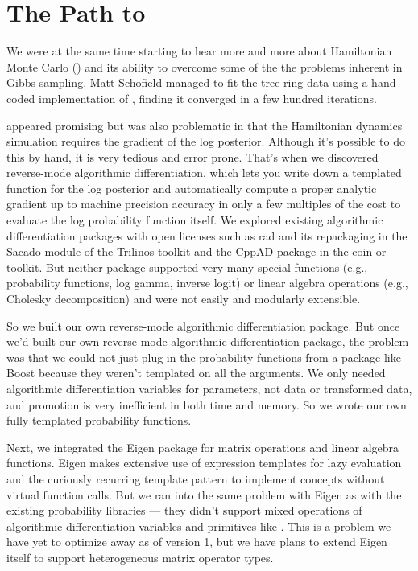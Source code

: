 \section*{The Path to \Stan}

We were at the same time starting to hear more and more about
Hamiltonian Monte Carlo (\HMC) and its ability to overcome some of the
the problems inherent in Gibbs sampling.  Matt Schofield managed to
fit the tree-ring data using a hand-coded implementation of \HMC,
finding it converged in a few hundred iterations.

\HMC appeared promising but was also problematic in that the
Hamiltonian dynamics simulation requires the gradient of the log
posterior.  Although it's possible to do this by hand, it is very
tedious and error prone.  That's when we discovered reverse-mode
algorithmic differentiation, which lets you write down a templated
\Cpp function for the log posterior and automatically compute a proper
analytic gradient up to machine precision accuracy in only a few
multiples of the cost to evaluate the log probability function itself.
We explored existing algorithmic differentiation packages with open
licenses such as {\sc rad} \citep{Gay:2005} and its repackaging in the
Sacado module of the Trilinos toolkit and the {\small CppAD} package in the
{\sc coin-or} toolkit.  But neither package supported very many
special functions (e.g., probability functions, log gamma, inverse logit) or
linear algebra operations (e.g., Cholesky decomposition) and were not
easily and modularly extensible.  

So we built our own reverse-mode algorithmic differentiation package.
But once we'd built our own reverse-mode algorithmic differentiation
package, the problem was that we could not just plug in the
probability functions from a package like Boost because they weren't
templated on all the arguments.  We only needed algorithmic
differentiation variables for parameters, not data or transformed
data, and promotion is very inefficient in both time and memory.  So
we wrote our own fully templated probability functions.  

Next, we integrated the Eigen \Cpp package for matrix operations and
linear algebra functions.  Eigen makes extensive use of expression
templates for lazy evaluation and the curiously recurring template
pattern to implement concepts without virtual function calls.  But we
ran into the same problem with Eigen as with the existing probability
libraries --- they didn't support mixed operations of algorithmic
differentiation variables and primitives like .  This is
a problem we have yet to optimize away as of \Stan version 1, but we
have plans to extend Eigen itself to support heterogeneous 
matrix operator types.

